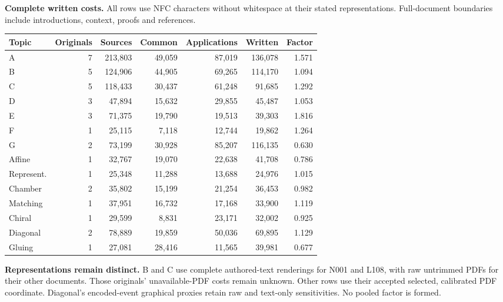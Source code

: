 \documentclass[11pt,a4paper]{article}
\newcommand{\tabsetup}{\small\setlength{\tabcolsep}{4pt}\renewcommand{\arraystretch}{1.10}}
\begin{document}
\textbf{Complete written costs.} All rows use NFC characters without whitespace at their stated representations. Full-document boundaries include introductions, context, proofs and references.
\begin{center}\tabsetup\begin{tabular}{lrrrrrr}\toprule
Topic & Originals & Sources & Common & Applications & Written & Factor\\\midrule
A & 7 & 213,803 & 49,059 & 87,019 & 136,078 & 1.571 \\
B & 5 & 124,906 & 44,905 & 69,265 & 114,170 & 1.094 \\
C & 5 & 118,433 & 30,437 & 61,248 & 91,685 & 1.292 \\
D & 3 & 47,894 & 15,632 & 29,855 & 45,487 & 1.053 \\
E & 3 & 71,375 & 19,790 & 19,513 & 39,303 & 1.816 \\
F & 1 & 25,115 & 7,118 & 12,744 & 19,862 & 1.264 \\
G & 2 & 73,199 & 30,928 & 85,207 & 116,135 & 0.630 \\
Affine & 1 & 32,767 & 19,070 & 22,638 & 41,708 & 0.786 \\
Represent. & 1 & 25,348 & 11,288 & 13,688 & 24,976 & 1.015 \\
Chamber & 2 & 35,802 & 15,199 & 21,254 & 36,453 & 0.982 \\
Matching & 1 & 37,951 & 16,732 & 17,168 & 33,900 & 1.119 \\
Chiral & 1 & 29,599 & 8,831 & 23,171 & 32,002 & 0.925 \\
Diagonal & 2 & 78,889 & 19,859 & 50,036 & 69,895 & 1.129 \\
Gluing & 1 & 27,081 & 28,416 & 11,565 & 39,981 & 0.677 \\
\bottomrule\end{tabular}\end{center}
\textbf{Representations remain distinct.} B and C use complete authored-text renderings for N001 and L108, with raw untrimmed PDFs for their other documents. Those originals' unavailable-PDF costs remain unknown. Other rows use their accepted selected, calibrated PDF coordinate. Diagonal's encoded-event graphical proxies retain raw and text-only sensitivities. No pooled factor is formed.
\end{document}
